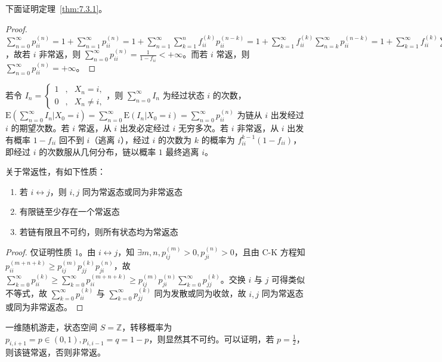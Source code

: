 \documentclass[../main.tex]{subfiles}
\begin{document}
下面证明定理~\ref{thm:7.3.1}。

\begin{proof}
    $\sum_{n=0}^\infty p_{ii}^{(n)}=1+\sum_{n=1}^\infty p_{ii}^{(n)}=1+\sum_{n=1}^\infty\sum_{k=1}^nf_{ii}^{(k)}p_{ii}^{(n-k)}=1+\sum_{k=1}^\infty f_{ii}^{(k)}\sum_{n=k}^\infty p_{ii}^{(n-k)}=1+\sum_{k=1}^\infty f_{ii}^{(k)}\sum_{n=0}^\infty p_{ii}^{(n)}=1+f_{ii}\sum_{n=0}^\infty p_{ii}^{(n)}$，故若 $i$ 非常返，则 $\sum_{n=0}^\infty p_{ii}^{(n)}=\frac1{1-f_{ii}}<+\infty$。而若 $i$ 常返，则 $\sum_{n=0}^\infty p_{ii}^{(n)}=+\infty$。
\end{proof}

若令 $I_n=\left\{\begin{aligned}
        1 & , & X_n=i,     \\
        0 & , & X_n\neq i,
    \end{aligned}\right.$，则 $\sum_{n=0}^\infty I_n$ 为经过状态 $i$ 的次数，$\mathrm E(\sum_{n=0}^\infty I_n|X_0=i)=\sum_{n=0}^\infty\mathrm E(I_n|X_0=i)=\sum_{n=0}^\infty p_{ii}^{(n)}$ 为链从 $i$ 出发经过 $i$ 的期望次数。若 $i$ 常返，从 $i$ 出发必定经过 $i$ 无穷多次。若 $i$ 非常返，从 $i$ 出发有概率 $1-f_{ii}$ 回不到 $i$（逃离 $i$），经过 $i$ 的次数为 $k$ 的概率为 $f_{ii}^{k-1}(1-f_{ii})$，即经过 $i$ 的次数服从几何分布，链以概率 $1$ 最终逃离 $i$。

\begin{theorem}\label{thm:7.3.2}
    关于常返性，有如下性质：
    \begin{enumerate}
        \item 若 $i\leftrightarrow j$，则 $i,j$ 同为常返态或同为非常返态
        \item 有限链至少存在一个常返态
        \item 若链有限且不可约，则所有状态均为常返态
    \end{enumerate}
\end{theorem}

\begin{proof}
    仅证明性质 1。由 $i\leftrightarrow j$，知 $\exists m,n,p_{ij}^{(m)}>0,p_{ji}^{(n)}>0$，且由 C-K 方程知 $p_{ii}^{(m+n+k)}\geq p_{ij}^{(m)}p_{jj}^{(k)}p_{ji}^{(n)}$，故 $\sum_{k=0}^\infty p_{ii}^{(k)}\geq\sum_{k=0}^\infty p_{ii}^{(m+n+k)}\geq p_{ij}^{(m)}p_{ji}^{(n)}\sum_{k=0}^\infty p_{jj}^{(k)}$。交换 $i$ 与 $j$ 可得类似不等式，故 $\sum_{k=0}^\infty p_{ii}^{(k)}$ 与 $\sum_{k=0}^\infty p_{jj}^{(k)}$ 同为发散或同为收敛，故 $i,j$ 同为常返态或同为非常返态。
\end{proof}

\begin{example}
    一维随机游走，状态空间 $S=\mathbb Z$，转移概率为 $p_{i,i+1}=p\in(0,1),p_{i,i-1}=q=1-p$，则显然其不可约。可以证明，若 $p=\frac12$，则该链常返，否则非常返。
\end{example}
\end{document}
